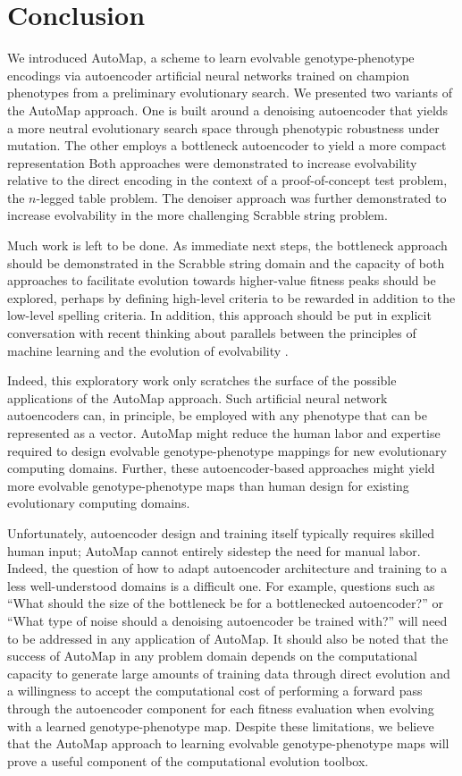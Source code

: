 \section{Conclusion} \label{sec:conclusion}

We introduced AutoMap, a scheme to learn evolvable genotype-phenotype encodings via autoencoder artificial neural networks trained on champion phenotypes from a preliminary evolutionary search.
We presented two variants of the AutoMap approach.
One is built around a denoising autoencoder that yields a more neutral evolutionary search space through phenotypic robustness under mutation.
The other employs a bottleneck autoencoder to yield a more compact representation
Both approaches were demonstrated to increase evolvability relative to the direct encoding in the context of a proof-of-concept test problem, the $n$-legged table problem.
The denoiser approach was further demonstrated to increase evolvability in the more challenging Scrabble string problem.

Much work is left to be done.
As immediate next steps, the bottleneck approach should be demonstrated in the Scrabble string domain and the capacity of both approaches to facilitate evolution towards higher-value fitness peaks should be explored, perhaps by defining high-level criteria to be rewarded in addition to the low-level spelling criteria.
In addition, this approach should be put in explicit conversation with recent thinking about parallels between the principles of machine learning and the evolution of evolvability \cite{kouvaris2017evolution, watson2016can}.

Indeed, this exploratory work only scratches the surface of the possible applications of the AutoMap approach.
Such artificial neural network autoencoders can, in principle, be employed with any phenotype that can be represented as a vector.
AutoMap might reduce the human labor and expertise required to design evolvable genotype-phenotype mappings for new evolutionary computing domains.
Further, these autoencoder-based approaches might yield more evolvable genotype-phenotype maps than human design for existing evolutionary computing domains.

Unfortunately, autoencoder design and training itself typically requires skilled human input; AutoMap cannot entirely sidestep the need for manual labor.
Indeed, the question of how to adapt autoencoder architecture and training to a less well-understood domains is a difficult one.
For example, questions such as ``What should the size of the bottleneck be for a bottlenecked autoencoder?'' or ``What type of noise should a denoising autoencoder be trained with?'' will need to be addressed in any application of AutoMap.
It should also be noted that the success of AutoMap in any problem domain depends on the computational capacity to generate large amounts of training data through direct evolution and a willingness to accept the computational cost of performing a forward pass through the autoencoder component for each fitness evaluation when evolving with a learned genotype-phenotype map.
Despite these limitations, we believe that the AutoMap approach to learning evolvable genotype-phenotype maps will prove a useful component of the computational evolution toolbox.
